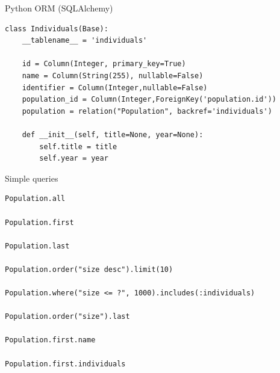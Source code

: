 \documentclass[12pt]{beamer}
\begin{document}
\begin{frame}[fragile]
  \begin{block}{Python ORM (SQLAlchemy)}
	\begin{verbatim}
class Individuals(Base):
    __tablename__ = 'individuals'
 
    id = Column(Integer, primary_key=True)
    name = Column(String(255), nullable=False)
    identifier = Column(Integer,nullable=False)
    population_id = Column(Integer,ForeignKey('population.id'))
    population = relation("Population", backref='individuals')
 
    def __init__(self, title=None, year=None):
        self.title = title
        self.year = year
	\end{verbatim}
  \end{block} 
\end{frame}


\begin{frame}[fragile]
  \begin{block}{Simple queries}
	\begin{verbatim}
Population.all

Population.first

Population.last

Population.order("size desc").limit(10)

Population.where("size <= ?", 1000).includes(:individuals)

Population.order("size").last

Population.first.name

Population.first.individuals
	\end{verbatim}
  \end{block}  
\end{frame}
\end{document}
